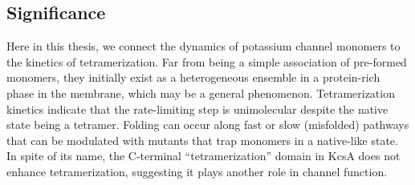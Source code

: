 \subsection{Significance}
Here in this thesis, we connect the dynamics of potassium channel monomers to the kinetics of tetramerization. Far from being a simple association of pre-formed monomers, they initially exist as a heterogeneous ensemble in a protein-rich phase in the membrane, which may be a general phenomenon. Tetramerization kinetics indicate that the rate-limiting step is unimolecular despite the native state being a tetramer. Folding can occur along fast or slow (misfolded) pathways that can be modulated with mutants that trap monomers in a native-like state. In spite of its name, the C-terminal “tetramerization” domain in KcsA does not enhance tetramerization, suggesting it plays another role in channel function.



